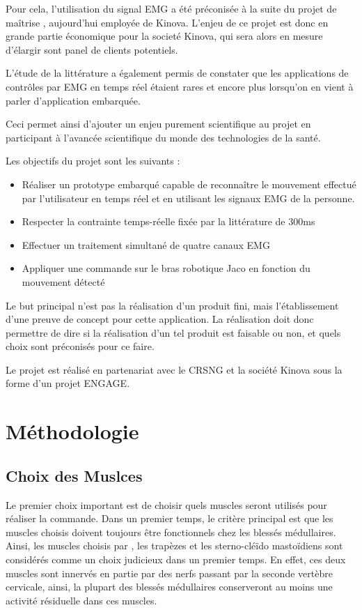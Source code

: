 \documentclass[letterpaper, twoside, 12pt, memoire, creativecommons, hyperref]{thETS}
\begin{document}
Pour cela, l'utilisation du signal EMG a été préconisée à la suite du projet de maîtrise \cite{Maheu2011}, aujourd'hui employée de Kinova. L'enjeu de ce projet est donc en grande partie économique pour la societé Kinova, qui sera alors en mesure d'élargir sont panel de clients potentiels.

L'étude de la littérature a également permis de constater que les applications de contrôles par EMG en temps réel étaient rares et encore plus lorsqu'on en vient à parler d'application embarquée.

Ceci permet ainsi d'ajouter un enjeu purement scientifique au projet en participant à l'avancée scientifique du monde des technologies de la santé.

Les objectifs du projet sont les suivants : 

\begin{itemize}
 \item Réaliser un prototype embarqué capable de reconnaître le mouvement effectué par l'utilisateur en temps réel et en utilisant les signaux EMG de la personne.
 \item Respecter la contrainte temps-réelle fixée par la littérature de 300ms
 \item Effectuer un traitement simultané de quatre canaux EMG
 \item Appliquer une commande sur le bras robotique Jaco en fonction du mouvement détecté
\end{itemize}

Le but principal n'est pas la réalisation d'un produit fini, mais l'établissement d'une preuve de concept pour cette application. La réalisation doit donc permettre de dire si la réalisation d'un tel produit est faisable ou non, et quels choix sont préconisés pour ce faire.

Le projet est réalisé en partenariat avec le CRSNG et la société Kinova sous la forme d'un projet ENGAGE. 

\chapter{Méthodologie}
\label{CHmethodo}

\section{Choix des Muslces}

Le premier choix important est de choisir quels muscles seront utilisés pour réaliser la commande. Dans un premier temps, le critère principal est que les muscles choisis doivent toujours être fonctionnels chez les blessés médullaires. Ainsi, les muscles choisis par \cite{Chang1996}, les trapèzes et les sterno-cléïdo mastoïdiens sont considérés comme un choix judicieux dans un premier temps. En effet, ces deux muscles sont innervés en partie par des nerfs passant par la seconde vertèbre cervicale, ainsi, la plupart des blessés médullaires conserveront au moins une activité résiduelle dans ces muscles. 
\end{document}
